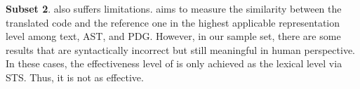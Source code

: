 \textbf{Subset 2}.
{\model} also suffers limitations.  {\model} aims to measure the
similarity between the translated code and the reference one in the
highest applicable representation level among text, AST, and
PDG. However, in our sample set, there are some results that are
syntactically incorrect but still meaningful in human perspective. In
these cases, the effectiveness level of {\model} is only achieved as
the lexical level via STS. Thus, it is not as effective.



